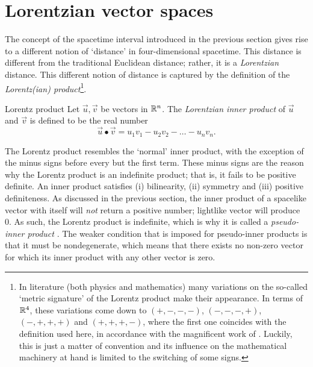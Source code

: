 \section{Lorentzian vector spaces}
\label{sec:lorentz_metric}
The concept of the spacetime interval introduced in the previous section gives rise to a different notion of `distance' in four-dimensional spacetime. This distance is different from the traditional Euclidean distance; rather, it is a \emph{Lorentzian} distance. This different notion of distance is captured by the definition of the \emph{Lorentz(ian) product}\footnote{In literature (both physics and mathematics) many variations on the so-called `metric signature' of the Lorentz product make their appearance. In terms of \(\mathbb{R}^4\), these variations come down to \((+,-,-,-)\), \((-,-,-,+)\), \((-,+,+,+)\) and \((+,+,+,-)\), where the first one coincides with the definition used here, in accordance with the magnificent work of \citet{Landau1971}. Luckily, this is just a matter of convention and its influence on the mathematical machinery at hand is limited to the switching of some signs.}.

\begin{thmblock}{Lorentz product}
    Let \(\vec{u}, \vec{v}\) be vectors in \(\mathbb{R}^n\). The \emph{Lorentzian inner product} of \(\vec{u}\) and \(\vec{v}\) is defined to be the real number
    \begin{equation}
        \vec{u} \bullet \vec{v} = u_1v_1 - u_2v_2 - \ldots - u_nv_n.
        \label{eq:lorentz_product}
    \end{equation}
\end{thmblock}
The Lorentz product resembles the `normal'  inner product, with the exception of the minus signs before every but the first term. These minus signs are the reason why the Lorentz product is an indefinite product; that is, it fails to be positive definite. An inner product satisfies (i) bilinearity, (ii) symmetry and (iii) positive definiteness. As discussed in the previous section, the inner product of a spacelike vector with itself will \emph{not} return a positive number;  lightlike vector will produce 0. As such, the Lorentz product is indefinite, which is why it is called a \emph{pseudo-inner product} \cite{Ratcliffe2019,Schuller2014}. The weaker condition that is imposed for pseudo-inner products is that it must be nondegenerate, which means that there exists no non-zero vector for which its inner product with any other vector is zero.

